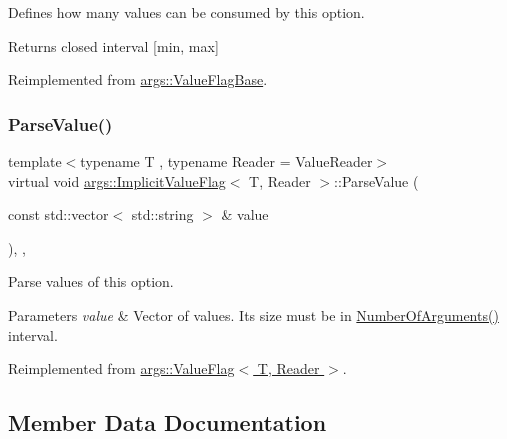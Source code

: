 Defines how many values can be consumed by this option.

\begin{DoxyReturn}{Returns}
closed interval \mbox{[}min, max\mbox{]} 
\end{DoxyReturn}


Reimplemented from \hyperlink{classargs_1_1_value_flag_base_a96a10bfb949ad175dcf2ffba6a6ec3b6}{args\+::\+Value\+Flag\+Base}.

\mbox{\label{classargs_1_1_implicit_value_flag_a4c3124a516ca870903c4788dce781292}} 
\subsubsection{\texorpdfstring{Parse\+Value()}{ParseValue()}}
{\footnotesize\ttfamily template$<$typename T , typename Reader  = Value\+Reader$>$ \\
virtual void \hyperlink{classargs_1_1_implicit_value_flag}{args\+::\+Implicit\+Value\+Flag}$<$ T, Reader $>$\+::Parse\+Value (\begin{DoxyParamCaption}\item[{const std\+::vector$<$ std\+::string $>$ \&}]{value }\end{DoxyParamCaption})\hspace{0.3cm}{\ttfamily [inline]}, {\ttfamily [override]}, {\ttfamily [virtual]}}

Parse values of this option.


\begin{DoxyParams}{Parameters}
{\em value} & Vector of values. It\textquotesingle{}s size must be in \hyperlink{classargs_1_1_implicit_value_flag_a7cfc67aca2b32921e722f51d349df2c5}{Number\+Of\+Arguments()} interval. \\
\hline
\end{DoxyParams}


Reimplemented from \hyperlink{classargs_1_1_value_flag_af3a872ae8fb0fa34814cbc7e133aa9bf}{args\+::\+Value\+Flag$<$ T, Reader $>$}.



\subsection{Member Data Documentation}
\mbox{\label{classargs_1_1_implicit_value_flag_a3cd2d0dac7fc96c4518608bb1525d934}} 
